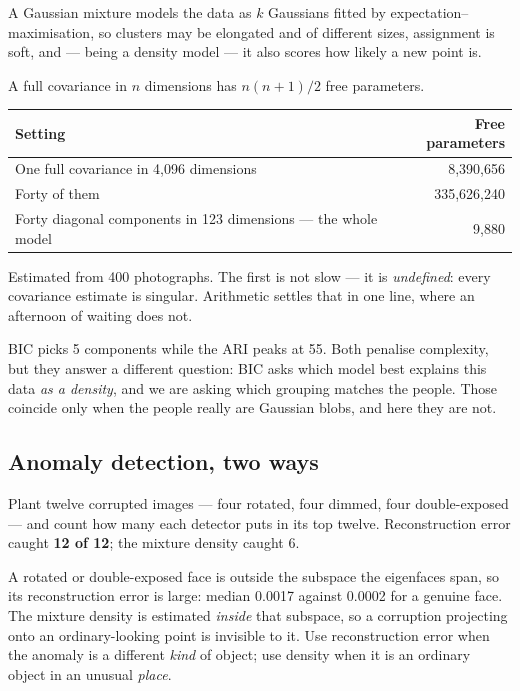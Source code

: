 \documentclass[11pt,a4paper]{article}
\begin{document}
A Gaussian mixture models the data as $k$ Gaussians fitted by
expectation--maximisation, so clusters may be elongated and of different sizes,
assignment is soft, and --- being a density model --- it also scores how likely
a new point is.

\begin{failbox}[title={Why this needed the first half of the lecture}]
A full covariance in $n$ dimensions has $n(n+1)/2$ free parameters.

\begin{center}
\small
\begin{tabular}{lr}
\toprule
\textbf{Setting} & \textbf{Free parameters} \\
\midrule
One full covariance in 4{,}096 dimensions & 8{,}390{,}656 \\
Forty of them & 335{,}626{,}240 \\
Forty diagonal components in 123 dimensions --- the whole model & 9{,}880 \\
\bottomrule
\end{tabular}
\end{center}

Estimated from 400 photographs. The first is not slow --- it is
\emph{undefined}: every covariance estimate is singular. Arithmetic settles
that in one line, where an afternoon of waiting does not.
\end{failbox}

BIC picks 5 components while the ARI peaks at 55. Both penalise complexity, but
they answer a different question: BIC asks which model best explains this data
\emph{as a density}, and we are asking which grouping matches the people. Those
coincide only when the people really are Gaussian blobs, and here they are not.

\subsection{Anomaly detection, two ways}

Plant twelve corrupted images --- four rotated, four dimmed, four
double-exposed --- and count how many each detector puts in its top twelve.
Reconstruction error caught \textbf{12 of 12}; the mixture density caught 6.

A rotated or double-exposed face is outside the subspace the eigenfaces span,
so its reconstruction error is large: median 0.0017 against 0.0002 for a
genuine face. The mixture density is estimated \emph{inside} that subspace, so
a corruption projecting onto an ordinary-looking point is invisible to it. Use
reconstruction error when the anomaly is a different \emph{kind} of object; use
density when it is an ordinary object in an unusual \emph{place}.
\end{document}
